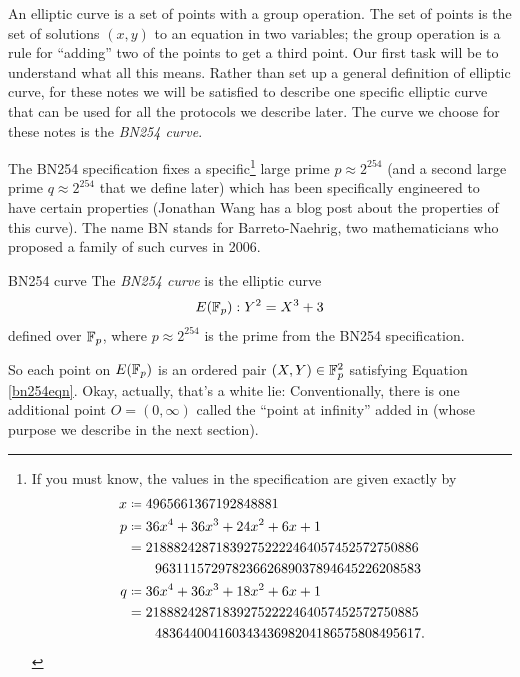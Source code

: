 An \alert{elliptic curve} is a set of points with a group operation. The
set of points is the set of solutions $(x,y)$ to an equation in two
variables; the group operation is a rule for ``adding'' two of the
points to get a third point. Our first task will be to understand what
all this means. Rather than set up a general definition of elliptic
curve, for these notes we will be satisfied to describe one specific
elliptic curve that can be used for all the protocols we describe later.
The curve we choose for these notes is the \emph{BN254 curve}.

The BN254 specification fixes a specific\footnote{If you must know, the
  values in the specification are given exactly by
  \begin{align*}
  x & \defeq 4965661367192848881 \\
  p & \defeq 36x^{4} + 36x^{3} + 24x^{2} + 6x + 1 \\
  & = 218882428718392752222464057452572750886 \\
  & \hspace{20pt} 96311157297823662689037894645226208583 \\
  q & \defeq 36x^{4} + 36x^{3} + 18x^{2} + 6x + 1 \\
  & = 218882428718392752222464057452572750885 \\
  & \hspace{20pt} 48364400416034343698204186575808495617.
  \end{align*}
}
large prime $p \approx 2^{254}$ (and a second large
prime $q \approx 2^{254}$ that we define later) which has been
specifically engineered to have certain properties (Jonathan Wang has a
blog post about the properties of
this curve). The name BN stands for Barreto-Naehrig, two mathematicians
who proposed a family of such curves in 2006.

\begin{definition}{BN254 curve}{}
The \emph{BN254 curve} is the elliptic curve
\begin{equation}
\label{bn254eqn}
E(\mathbb{F}_p) : Y^2 = X^3 + 3
\end{equation}
defined over $\mathbb{F}_p$, where $p \approx 2^{254}$
is the prime from the BN254 specification.
\end{definition}

So each point on $E( \mathbb{F}_{p} )$ is an ordered pair
$(X,Y) \in \mathbb{F}_{p}^{2}$ satisfying Equation \eqref{bn254eqn}.
Okay, actually, that's a white lie: Conventionally, there is one additional
point $O = (0,\infty)$ called the ``point at infinity'' added in
(whose purpose we describe in the next section).

